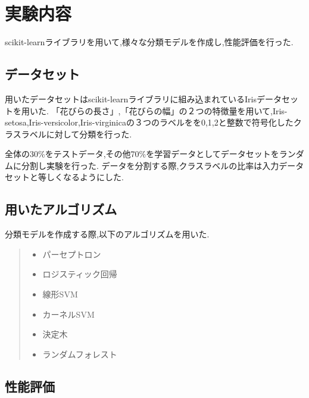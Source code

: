 \documentclass[twocolumn]{jarticle}     %
\begin{document}

\section{実験内容}
scikit-learnライブラリを用いて,様々な分類モデルを作成し,性能評価を行った.

\subsection*{データセット}
用いたデータセットはscikit-learnライブラリに組み込まれているIrisデータセットを用いた.
「花びらの長さ」,「花びらの幅」の２つの特徴量を用いて,Iris-setosa,Iris-versicolor,Iris-virginicaの３つのラベルをを0,1,2と整数で符号化したクラスラベルに対して分類を行った.
\par
全体の30\%をテストデータ,その他70\%を学習データとしてデータセットをランダムに分割し実験を行った.
データを分割する際,クラスラベルの比率は入力データセットと等しくなるようにした.

\subsection*{用いたアルゴリズム}
分類モデルを作成する際,以下のアルゴリズムを用いた.

\begin{quote}
  \begin{itemize}
   \item パーセプトロン
   \item ロジスティック回帰
   \item 線形SVM
   \item カーネルSVM
   \item 決定木
   \item ランダムフォレスト
  \end{itemize}
 \end{quote}



\subsection*{性能評価}
\end{document}
